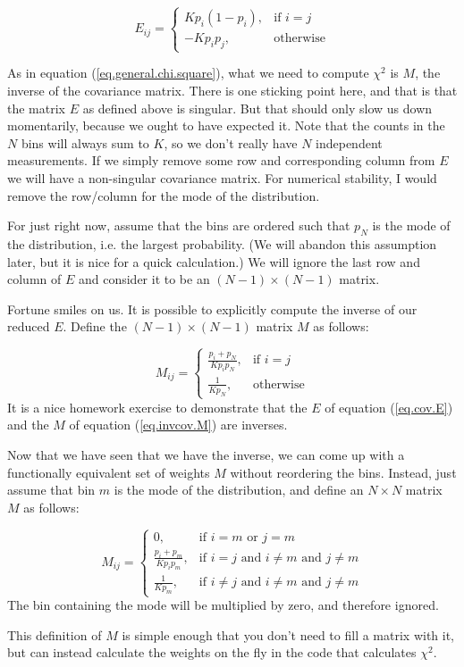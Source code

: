 \documentclass[letterpaper,12pt]{article}
\newcommand{\myMatrix}[1]{\bm{\mathit{#1}}}
\begin{document}
\begin{equation} \label{eq.cov.E}
	\myMatrix{E}_{ij}=
	\begin{cases}
		Kp_i(1-p_i), & \text{if } i=j \\
		-Kp_ip_j,  & \text{otherwise}
	\end{cases}
\end{equation}

As in equation (\ref{eq.general.chi.square}), what we need to compute $\chi^2$ is $\myMatrix{M}$, the inverse of the covariance matrix. There is one sticking point here, and that is that the matrix $\myMatrix{E}$ as defined above is singular. But that should only slow us down momentarily, because we ought to have expected it. Note that the counts in the $N$ bins will always sum to $K$, so we don't really have $N$ independent measurements. If we simply remove some row and corresponding column from $\myMatrix{E}$ we will have a non-singular covariance matrix. For numerical stability, I would remove the row/column for the mode of the distribution.

For just right now, assume that the bins are ordered such that $p_N$ is the mode of the distribution, i.e. the largest probability. (We will abandon this assumption later, but it is nice for a quick calculation.) We will ignore the last row and column of $\myMatrix{E}$ and consider it to be an $(N-1) \times (N-1)$ matrix.

Fortune smiles on us. It is possible to explicitly compute the inverse of our reduced $\myMatrix{E}$. Define the $(N-1) \times (N-1)$ matrix $\myMatrix{M}$ as follows:

\begin{equation} \label{eq.invcov.M}
	\myMatrix{M}_{ij}=
	\begin{cases}
		\frac{p_i+p_N}{Kp_ip_N}, & \text{if } i=j \\
		\frac{1}{Kp_N},  & \text{otherwise}
	\end{cases}
\end{equation}
It is a nice homework exercise to demonstrate that the $\myMatrix{E}$ of equation (\ref{eq.cov.E}) and the $\myMatrix{M}$ of equation (\ref{eq.invcov.M}) are inverses.

Now that we have seen that we have the inverse, we can come up with a functionally equivalent set of weights $\myMatrix{M}$ without reordering the bins. Instead, just assume that bin $m$ is the mode of the distribution, and define an $N \times N$ matrix $\myMatrix{M}$ as follows:

\begin{equation} \label{eq.invcov.M}
	\myMatrix{M}_{ij}=
	\begin{cases}
		0, & \text{if }i=m\text{ or }j=m \\
		\frac{p_i+p_m}{Kp_ip_m}, & \text{if }i=j\text{ and }i\ne m\text{ and }j\ne m \\
		\frac{1}{Kp_m},  & \text{if }i\ne j\text{ and }i\ne m\text{ and }j\ne m
	\end{cases}
\end{equation}
The bin containing the mode will be multiplied by zero, and therefore ignored.

This definition of $\myMatrix{M}$ is simple enough that you don't need to fill a matrix with it, but can instead calculate the weights on the fly in the code that calculates $\chi^2$.
\end{document}
